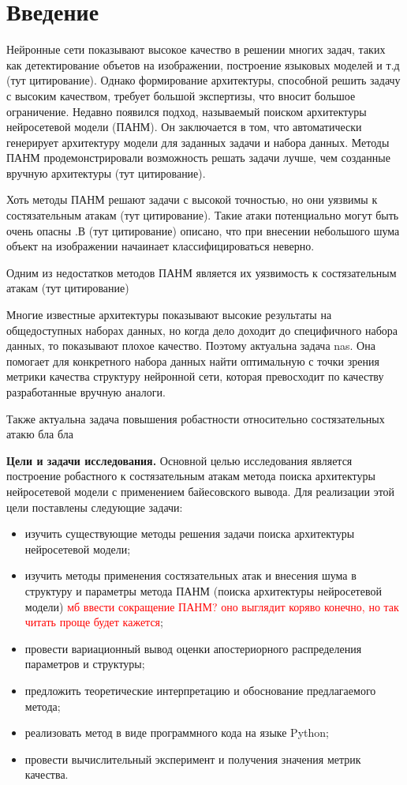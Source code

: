 \documentclass[12pt]{article}
\begin{document}
	\section{Введение}
	
	Нейронные сети показывают высокое качество в решении многих задач, таких как детектирование объетов на изображении, построение языковых моделей и т.д (тут цитирование). Однако формирование архитектуры, способной решить задачу с высоким качеством, требует большой экспертизы, что вносит большое ограничение. Недавно появился подход, называемый поиском архитектуры нейросетевой модели (ПАНМ). Он заключается в том, что автоматически генерирует архитектуру модели для заданных задачи и набора данных. Методы ПАНМ продемонстрировали возможность решать задачи лучше, чем созданные вручную архитектуры (тут цитирование).
	
	Хоть методы ПАНМ решают задачи с высокой точностью, но они уязвимы к состязательным атакам (тут цитирование). Такие атаки потенциально могут быть очень опасны \cite{DBLP:journals/corr/PapernotMGJCS16}.В (тут цитирование) описано, что при внесении небольшого шума объект на изображении начаинает классифицироваться неверно. 
	
	Одним из недостатков методов ПАНМ является их уязвимость к состязательным атакам (тут цитирование)
	
	Многие известные архитектуры показывают высокие результаты на общедоступных наборах данных, но когда дело доходит до специфичного набора данных, то показывают плохое качество. Поэтому актуальна задача nas. Она помогает для конкретного набора данных найти оптимальную с точки зрения метрики качества структуру нейронной сети, которая превосходит по качеству разработанные вручную аналоги.
	
	Также актуальна задача повышения робастности относительно состязательных атакю бла бла
	
	
	\textbf{Цели и задачи исследования.} Основной целью исследования является построение робастного к состязательным атакам метода поиска архитектуры нейросетевой модели с применением байесовского вывода. Для реализации этой цели поставлены следующие задачи:
	\begin{itemize}
		\item изучить существующие методы решения задачи поиска архитектуры нейросетевой модели;
		\item изучить методы применения состязательных атак и внесения шума в структуру и параметры метода ПАНМ (поиска архитектуры нейросетевой модели) \textcolor{red}{мб ввести сокращение ПАНМ? оно выглядит коряво конечно, но так читать проще будет кажется};
		\item провести вариационный вывод оценки апостериорного распределения параметров и структуры;
		\item предложить теоретические интерпретацию и обоснование предлагаемого метода;
		\item реализовать метод в виде программного кода на языке Python;
		\item провести вычислительный эксперимент и получения значения метрик качества.
	\end{itemize}
	
\end{document}

